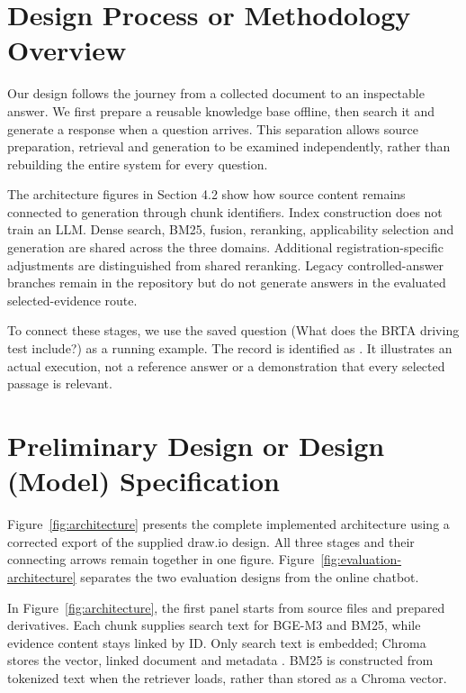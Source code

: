 \section{Design Process or Methodology Overview }
Our design follows the journey from a collected document to an inspectable answer. We first prepare a reusable knowledge base offline, then search it and generate a response when a question arrives. This separation allows source preparation, retrieval and generation to be examined independently, rather than rebuilding the entire system for every question.

The architecture figures in Section 4.2 show how source content remains connected to generation through chunk identifiers. Index construction does not train an LLM. Dense search, BM25, fusion, reranking, applicability selection and generation are shared across the three domains. Additional registration-specific adjustments are distinguished from shared reranking. Legacy controlled-answer branches remain in the repository but do not generate answers in the evaluated selected-evidence route.

To connect these stages, we use the saved question  (What does the BRTA driving test include?) as a running example. The record is identified as . It illustrates an actual execution, not a reference answer or a demonstration that every selected passage is relevant.

\section{Preliminary Design or Design (Model) Specification}
Figure~\ref{fig:architecture} presents the complete implemented architecture using a corrected export of the supplied draw.io design. All three stages and their connecting arrows remain together in one figure. Figure~\ref{fig:evaluation-architecture} separates the two evaluation designs from the online chatbot.



In Figure~\ref{fig:architecture}, the first panel starts from source files and prepared derivatives. Each chunk supplies search text for BGE-M3 and BM25, while evidence content stays linked by ID. Only search text is embedded; Chroma stores the vector, linked document and metadata \cite{bgem3,chroma_docs}. BM25 is constructed from tokenized text when the retriever loads, rather than stored as a Chroma vector.

